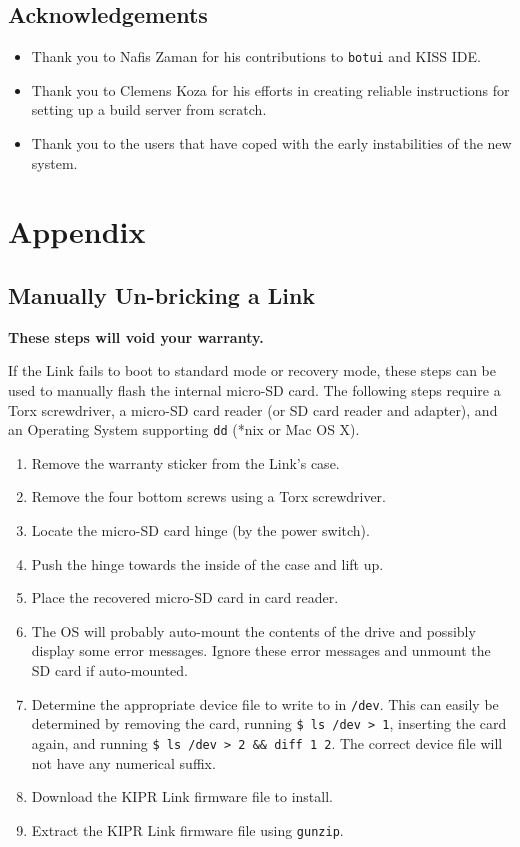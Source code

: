 \documentclass[12pt,letterpaper]{article}
\begin{document}
	\subsection{Acknowledgements}
	\begin{itemize}
		\setlength{\itemsep}{0em}
		\item Thank you to Nafis Zaman for his contributions to \texttt{botui} and KISS IDE.
		\item Thank you to Clemens Koza for his efforts in creating reliable instructions for setting up a build server from scratch.
		\item Thank you to the users that have coped with the early instabilities of the new system.
	\end{itemize}

	
	\section{Appendix}
	
	\subsection{Manually Un-bricking a Link}
	\noindent \textbf{These steps will void your warranty.}
	
	\noindent If the Link fails to boot to standard mode or recovery mode, these steps can be used to manually flash the internal micro-SD card. The following steps require a Torx screwdriver, a micro-SD card reader (or SD card reader and adapter), and an Operating System supporting \texttt{dd} (*nix or Mac OS X).
	
	\begin{enumerate}
		\setlength{\itemsep}{0em}
		\item Remove the warranty sticker from the Link's case.
		\item Remove the four bottom screws using a Torx screwdriver.
		\item Locate the micro-SD card hinge (by the power switch).
		\item Push the hinge towards the inside of the case and lift up.
		\item Place the recovered micro-SD card in card reader.
		\item The OS will probably auto-mount the contents of the drive and
		possibly display some error messages. Ignore these error messages and
		unmount the SD card if auto-mounted.
		\item Determine the appropriate device file to write to in \texttt{/dev}.
		This can easily be determined by removing the card,
		running \texttt{\$ ls /dev > 1}, inserting the card again, 
		and running \texttt{\$ ls /dev > 2 \&\& diff 1 2}. The correct
		device file will not have any numerical suffix.
		\item Download the KIPR Link firmware file to install.
		\item Extract the KIPR Link firmware file using \texttt{gunzip}.
	\end{enumerate}
	
\end{document}
